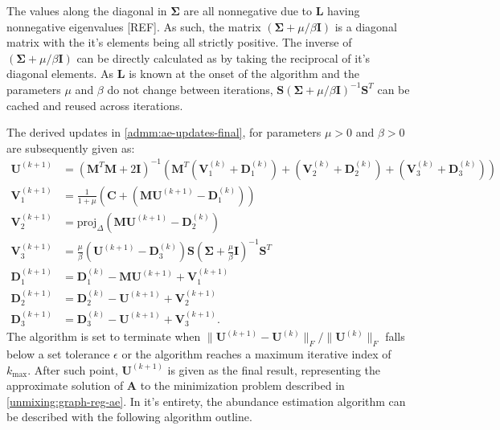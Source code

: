 The values along the diagonal in $\mathbf{\Sigma}$ are all nonnegative due to $\mathbf{L}$ having nonnegative eigenvalues [REF]. As such, the matrix $(\mathbf{\Sigma} + \mu / \beta \mathbf{I})$ is a diagonal matrix with the it's elements being all strictly positive. The inverse of $\left(\mathbf{\Sigma} + \mu / \beta \mathbf{I}\right)$ can be directly calculated as by taking the reciprocal of it's diagonal elements. As $\mathbf{L}$ is known at the onset of the algorithm and the parameters $\mu$ and $\beta$ do not change between iterations, $\mathbf{S} (\mathbf{\Sigma} + \mu / \beta \mathbf{I})^{-1} \mathbf{S}^T$ can be cached and reused across iterations.

The derived updates in \eqref{admm:ae-updates-final}, for parameters $\mu > 0$ and $\beta > 0$ are subsequently given as:
\begin{subequations}
  \begin{align}
    \mathbf{U}^{(k+1)} & = (\mathbf{M}^T \mathbf{M} + 2\mathbf{I})^{-1}\left(\mathbf{M}^T\left(\mathbf{V}_1^{(k)}+\mathbf{D}_1^{(k)}\right) + \left(\mathbf{V}_2^{(k)}+\mathbf{D}_2^{(k)}\right) + \left(\mathbf{V}_3^{(k)}+\mathbf{D}_3^{(k)}\right)\right) \label{unmixing:u} 
    \\
    \mathbf{V}_1^{(k+1)} &= \frac{1}{1+\mu} \left(\mathbf{C} + \left(\mathbf{MU}^{(k+1)} - \mathbf{D}_1^{(k)}\right)\right) \label{unmixing:v1} 
    \\
    \mathbf{V}_2^{(k+1)} &= \text{proj}_\Delta\left(\mathbf{MU}^{(k+1)} - \mathbf{D}_2^{(k)}\right) \label{unmixing:v2} 
    \\
    \mathbf{V}_3^{(k+1)} &= \frac{\mu}{\beta}\left(\mathbf{U}^{(k+1)} - \mathbf{D}_3^{(k)}\right) \mathbf{S} \left(\mathbf{\Sigma} + \frac{\mu}{\beta} \mathbf{I}\right)^{-1} \mathbf{S}^T \label{unmixing:v3} 
    \\
    \mathbf{D}_1^{(k+1)} &= \mathbf{D}_1^{(k)} - \mathbf{MU}^{(k+1)} + \mathbf{V}_1^{(k+1)} \label{unmixing:d1}  \\
    \mathbf{D}_2^{(k+1)} &= \mathbf{D}_2^{(k)} - \mathbf{U}^{(k+1)} + \mathbf{V}_2^{(k+1)} \label{unmixing:d2}  \\
    \mathbf{D}_3^{(k+1)} &= \mathbf{D}_3^{(k)} - \mathbf{U}^{(k+1)} + \mathbf{V}_3^{(k+1)}. \label{unmixing:d3} 
  \end{align}
\end{subequations}
The algorithm is set to terminate when $ \|\mathbf{U}^{(k+1)} - \mathbf{U}^{(k)}\|_F/\|\mathbf{U}^{(k)}\|_F $ falls below a set tolerance $\epsilon$ or the algorithm reaches a maximum iterative index of $k_{\text{max}}$. After such point, $\mathbf{U}^{(k+1)}$ is given as the final result, representing the approximate solution of $\mathbf{A}$ to the minimization problem described in \eqref{unmixing:graph-reg-ae}. In it's entirety, the abundance estimation algorithm can be described with the following algorithm outline.

